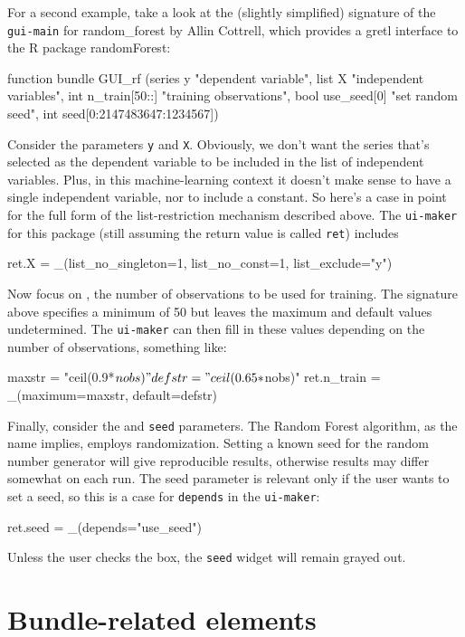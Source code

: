 \documentclass[oneside]{book}
\begin{document}
For a second example, take a look at the (slightly simplified)
signature of the \texttt{gui-main} for \textsf{random\_forest} by
Allin Cottrell, which provides a gretl interface to the \textsf{R}
package \textsf{randomForest}:
\begin{code}
function bundle GUI_rf (series y "dependent variable",
   list X "independent variables",
   int n_train[50::] "training observations",
   bool use_seed[0] "set random seed",
   int seed[0:2147483647:1234567])
\end{code}

Consider the parameters \texttt{y} and \texttt{X}. Obviously, we don't
want the series that's selected as the dependent variable to be
included in the list of independent variables. Plus, in this
machine-learning context it doesn't make sense to have a single
independent variable, nor to include a constant. So here's a case in
point for the full form of the list-restriction mechanism described
above.  The \texttt{ui-maker} for this package (still assuming the
return value is called \texttt{ret}) includes
\begin{code}
ret.X = _(list_no_singleton=1, list_no_const=1, list_exclude="y")
\end{code}

Now focus on , the number of observations to be used
for training. The signature above specifies a minimum of 50 but leaves
the maximum and default values undetermined. The \texttt{ui-maker} can
then fill in these values depending on the number of observations,
something like:
\begin{code}
maxstr = "ceil(0.9*$nobs)"
defstr = "ceil(0.65*$nobs)"
ret.n_train = _(maximum=maxstr, default=defstr)
\end{code}

Finally, consider the  and \texttt{seed}
parameters. The Random Forest algorithm, as the name implies, employs
randomization. Setting a known seed for the random number generator
will give reproducible results, otherwise results may differ somewhat
on each run. The seed parameter is relevant only if the user wants to
set a seed, so this is a case for \texttt{depends} in the
\texttt{ui-maker}:
\begin{code}
ret.seed = _(depends="use_seed")
\end{code}
Unless the user checks the  box, the \texttt{seed}
widget will remain grayed out.

\section{Bundle-related elements}
\label{sec:spec-bundle}
\end{document}
